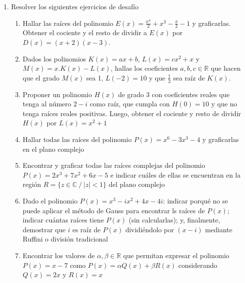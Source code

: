 \documentclass[a4paper]{article}
\newcommand{\exercise}{\item}
\newcommand{\df}[2]{\displaystyle\frac{#1}{#2}}
\begin{document}
\begin{enumerate}
\begin{enumerate} [label=(\alph*)]
	\end{enumerate}

	\exercise Resolver los siguientes ejercicios de desafío
	\begin{enumerate} [label=(\alph*)]
		
		\item Hallar las raíces del polinomio $E(x)=\df{x^4}{2}+x^3-\df{x}{2}-1$ y graficarlas. Obtener el cociente y el resto de dividir a $E(x)$ por $D(x)=(x+2)(x-3)$.

		\item Dados los polinomios $K(x)=ax+b$, $L(x)=cx^2+x$ y $M(x)=x.K(x)-L(x)$, hallas los coeficientes $a,b,c \in \mathbb{R}$ que hacen que el grado $M(x)$ sea 1, $L(-2)=10$ y que $\df{1}{2}$ sea raíz de $K(x)$.

		\item Proponer un polinomio $H(x)$ de grado 3 con coeficientes reales que tenga al número $2-i$ como raíz, que cumpla con $H(0)=10$ y que no tenga raíces reales positivas. Luego, obtener el cociente y resto de dividir $H(x)$ por $L(x)=x^2+1$

		\item Hallar todas las raíces del polinomio $P(x)=x^6-3x^3-4$ y graficarlas en el plano complejo

		\item Encontrar y graficar todas las raíces complejas del polinomio $P(x)=2x^3+7x^2+6x-5$ e indicar cuáles de ellas se encuentran en la región $R=\{ z \in \mathbb{C} ~/~ |z|<1 \}$ del plano complejo

		\item Dado el polinomio $P(x)=x^3-ix^2+4x-4i$: indicar porqué no se puede aplicar el método de Gauss para encontrar ls raíces de $P(x)$; indicar cuántas raíces tiene $P(x)$ (sin calcularlas); y, finalmente, demostrar que $i$ es raíz de $P(x)$ dividiéndolo por $(x-i)$ mediante Ruffini o división tradicional

		\item Encontrar los valores de $\alpha, \beta \in \mathbb{R}$ que permitan expresar el polinomio $P(x)=x-7$ como $P(x)=\alpha Q(x)+\beta R(x)$ considerando $Q(x)=2x$ y $R(x)=x$

	\end{enumerate}


\end{enumerate}
\end{document}
